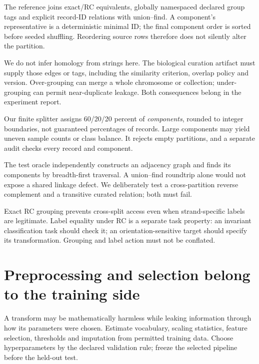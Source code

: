 The reference joins exact/RC equivalents, globally namespaced declared group
tags and explicit record-ID relations with union--find. A component's representative
is a deterministic minimal ID; the final component order is sorted before
seeded shuffling. Reordering source rows therefore does not silently alter
the partition.



We do not infer homology from strings here. The biological curation artifact
must supply those edges or tags, including the similarity criterion, overlap
policy and version. Over-grouping can merge a whole chromosome or collection;
under-grouping can permit near-duplicate leakage. Both consequences belong
in the experiment report.

Our finite splitter assigns 60/20/20 percent of \emph{components}, rounded
to integer boundaries, not guaranteed percentages of records. Large components
may yield uneven sample counts or class balance. It rejects empty partitions,
and a separate audit checks every record and component.


The test oracle independently constructs an adjacency graph and finds its
components by breadth-first traversal. A union--find roundtrip alone would
not expose a shared linkage defect. We deliberately test a cross-partition
reverse complement and a transitive curated relation; both must fail.

Exact RC grouping prevents cross-split access even when strand-specific labels
are legitimate. Label equality under RC is a separate task property:
an invariant classification task should check it; an orientation-sensitive
target should specify its transformation. Grouping and label action must not
be conflated.

\section{Preprocessing and selection belong to the training side}
A transform may be mathematically harmless while leaking information through
how its parameters were chosen. Estimate vocabulary, scaling statistics,
feature selection, thresholds and imputation from permitted training data.
Choose hyperparameters by the declared validation rule; freeze the selected
pipeline before the held-out test.

